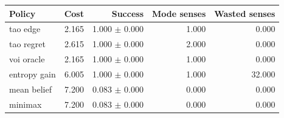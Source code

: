 \begin{tabular}{lrrrr}
\toprule
Policy & Cost & Success & Mode senses & Wasted senses \\
\midrule
tao edge & 2.165 & 1.000 $\pm$ 0.000 & 1.000 & 0.000 \\
tao regret & 2.615 & 1.000 $\pm$ 0.000 & 2.000 & 0.000 \\
voi oracle & 2.165 & 1.000 $\pm$ 0.000 & 1.000 & 0.000 \\
entropy gain & 6.005 & 1.000 $\pm$ 0.000 & 1.000 & 32.000 \\
mean belief & 7.200 & 0.083 $\pm$ 0.000 & 0.000 & 0.000 \\
minimax & 7.200 & 0.083 $\pm$ 0.000 & 0.000 & 0.000 \\
\bottomrule
\end{tabular}
